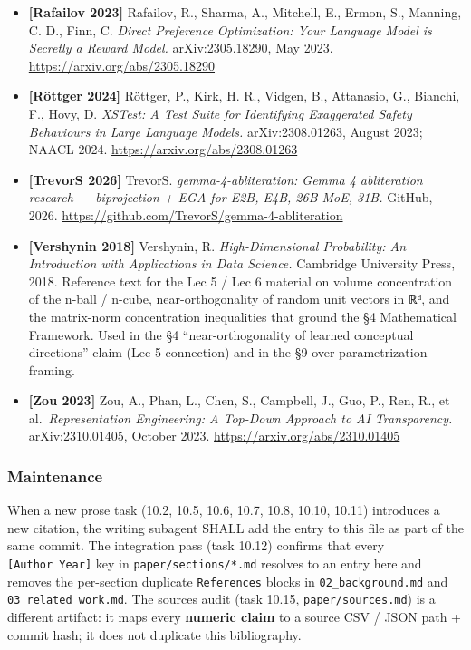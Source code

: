 \documentclass[
  11pt,
]{article}
\begin{document}
\begin{itemize}
  \url{https://github.com/p-e-w/heretic/pull/211}
\item
  \textbf{{[}Rafailov 2023{]}} Rafailov, R., Sharma, A., Mitchell, E.,
  Ermon, S., Manning, C. D., Finn, C. \emph{Direct Preference
  Optimization: Your Language Model is Secretly a Reward Model.}
  arXiv:2305.18290, May 2023. \url{https://arxiv.org/abs/2305.18290}
\item
  \textbf{{[}Röttger 2024{]}} Röttger, P., Kirk, H. R., Vidgen, B.,
  Attanasio, G., Bianchi, F., Hovy, D. \emph{XSTest: A Test Suite for
  Identifying Exaggerated Safety Behaviours in Large Language Models.}
  arXiv:2308.01263, August 2023; NAACL 2024.
  \url{https://arxiv.org/abs/2308.01263}
\item
  \textbf{{[}TrevorS 2026{]}} TrevorS. \emph{gemma-4-abliteration: Gemma
  4 abliteration research --- biprojection + EGA for E2B, E4B, 26B MoE,
  31B.} GitHub, 2026.
  \url{https://github.com/TrevorS/gemma-4-abliteration}
\item
  \textbf{{[}Vershynin 2018{]}} Vershynin, R. \emph{High-Dimensional
  Probability: An Introduction with Applications in Data Science.}
  Cambridge University Press, 2018. Reference text for the Lec 5 / Lec 6
  material on volume concentration of the n-ball / n-cube,
  near-orthogonality of random unit vectors in ℝᵈ, and the matrix-norm
  concentration inequalities that ground the §4 Mathematical Framework.
  Used in the §4 ``near-orthogonality of learned conceptual directions''
  claim (Lec 5 connection) and in the §9 over-parametrization framing.
\item
  \textbf{{[}Zou 2023{]}} Zou, A., Phan, L., Chen, S., Campbell, J.,
  Guo, P., Ren, R., et al.~\emph{Representation Engineering: A Top-Down
  Approach to AI Transparency.} arXiv:2310.01405, October 2023.
  \url{https://arxiv.org/abs/2310.01405}
\end{itemize}

\subsubsection{Maintenance}\label{maintenance}

When a new prose task (10.2, 10.5, 10.6, 10.7, 10.8, 10.10, 10.11)
introduces a new citation, the writing subagent SHALL add the entry to
this file as part of the same commit. The integration pass (task 10.12)
confirms that every \texttt{{[}Author\ Year{]}} key in
\texttt{paper/sections/*.md} resolves to an entry here and removes the
per-section duplicate \texttt{References} blocks in
\texttt{02\_background.md} and \texttt{03\_related\_work.md}. The
sources audit (task 10.15, \texttt{paper/sources.md}) is a different
artifact: it maps every \textbf{numeric claim} to a source CSV / JSON
path + commit hash; it does not duplicate this bibliography.
\end{document}
